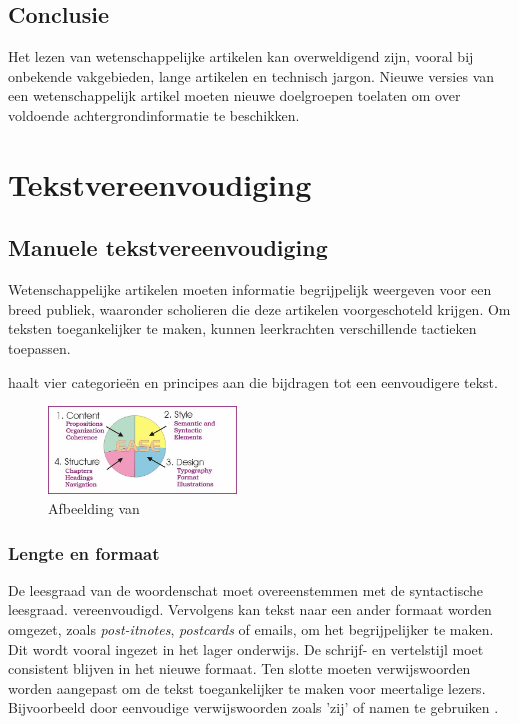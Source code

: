\subsection{Conclusie}

Het lezen van wetenschappelijke artikelen kan overweldigend zijn, vooral bij onbekende vakgebieden, lange artikelen en technisch jargon. Nieuwe versies van een wetenschappelijk artikel moeten nieuwe doelgroepen toelaten om over voldoende achtergrondinformatie te beschikken.

\section{Tekstvereenvoudiging}


\subsection{Manuele tekstvereenvoudiging}

Wetenschappelijke artikelen moeten informatie begrijpelijk weergeven voor een breed publiek, waaronder scholieren die deze artikelen voorgeschoteld krijgen. Om teksten toegankelijker te maken, kunnen leerkrachten verschillende tactieken toepassen.

\textcite{Dubay2004} haalt vier categorieën en principes aan die bijdragen tot een eenvoudigere tekst.

\begin{figure}[H]
	\begin{center}
		\includegraphics[width=5cm]{img/text-simplification-reading-ease.png}
	\end{center}
	\caption{Afbeelding van \textcite{Dubay2004}}
\end{figure}


\subsubsection{Lengte en formaat}

De leesgraad van de woordenschat moet overeenstemmen met de syntactische leesgraad. vereenvoudigd. Vervolgens kan tekst naar een ander formaat worden omgezet, zoals \textit{post-itnotes}, \textit{postcards} of emails, om het begrijpelijker te maken. Dit wordt vooral ingezet in het lager onderwijs. De schrijf- en vertelstijl moet consistent blijven in het nieuwe formaat. Ten slotte moeten verwijswoorden worden aangepast om de tekst toegankelijker te maken voor meertalige lezers. Bijvoorbeeld door eenvoudige verwijswoorden zoals 'zij' of namen te gebruiken \autocite{Rijkhoff2022}. 

